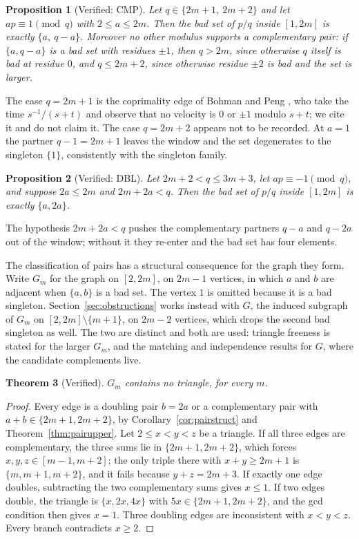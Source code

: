 \documentclass[11pt]{amsart}
\theoremstyle{plain}
\newtheorem{theorem}{Theorem}[section]
\newtheorem{proposition}[theorem]{Proposition}
\theoremstyle{definition}
\begin{document}
\begin{proposition}[Verified: CMP]\label{prop:cmp}
Let $q \in \{2m+1,\ 2m+2\}$ and let $a p \equiv 1 \pmod q$ with $2 \le a \le 2m$. Then the bad set
of $p/q$ inside $[1,2m]$ is exactly $\{a,\ q-a\}$. Moreover no other modulus supports a
complementary pair: if $\{a, q-a\}$ is a bad set with residues $\pm 1$, then $q > 2m$, since
otherwise $q$ itself is bad at residue $0$, and $q \le 2m+2$, since otherwise residue $\pm 2$ is bad
and the set is larger.
\end{proposition}

The case $q = 2m+1$ is the coprimality edge of Bohman and Peng \cite[\S3]{BP}, who take the time
$s^{-1}/(s+t)$ and observe that no velocity is $0$ or $\pm 1$ modulo $s+t$; we cite it and do not
claim it. The case $q = 2m+2$ appears not to be recorded. At $a = 1$ the partner $q-1 = 2m+1$ leaves
the window and the set degenerates to the singleton $\{1\}$, consistently with the singleton family.

\begin{proposition}[Verified: DBL]\label{prop:dbl}
Let $2m+2 < q \le 3m+3$, let $ap \equiv -1 \pmod q$, and suppose $2a \le 2m$ and $2m + 2a < q$. Then
the bad set of $p/q$ inside $[1,2m]$ is exactly $\{a, 2a\}$.
\end{proposition}

The hypothesis $2m + 2a < q$ pushes the complementary partners $q-a$ and $q-2a$ out of the window;
without it they re-enter and the bad set has four elements.

The classification of pairs has a structural consequence for the graph they form. Write $G_m$ for
the graph on $[2,2m]$, on $2m-1$ vertices, in which $a$ and $b$ are adjacent when $\{a,b\}$ is a bad
set. The vertex $1$ is omitted because it is a bad singleton. Section~\ref{sec:obstructions} works
instead with $G$, the induced subgraph of $G_m$ on $[2,2m]\setminus\{m+1\}$, on $2m-2$ vertices,
which drops the second bad singleton as well. The two are distinct and both are used: triangle
freeness is stated for the larger $G_m$, and the matching and independence results for $G$, where
the candidate complements live.

\begin{theorem}[Verified]\label{thm:trianglefree}
$G_m$ contains no triangle, for every $m$.
\end{theorem}

\begin{proof}
Every edge is a doubling pair $b = 2a$ or a complementary pair with $a + b \in \{2m+1, 2m+2\}$, by
Corollary~\ref{cor:pairstruct} and Theorem~\ref{thm:pairupper}. Let $2 \le x < y < z$ be a
triangle. If all three edges are complementary, the three sums lie in $\{2m+1,2m+2\}$, which forces
$x,y,z \in [m-1,m+2]$; the only triple there with $x+y \ge 2m+1$ is $\{m,m+1,m+2\}$, and it fails
because $y+z = 2m+3$. If exactly one edge doubles, subtracting the two complementary sums gives
$x \le 1$. If two edges double, the triangle is $\{x,2x,4x\}$ with $5x \in \{2m+1,2m+2\}$, and the
gcd condition then gives $x = 1$. Three doubling edges are inconsistent with $x<y<z$. Every branch
contradicts $x \ge 2$.
\end{proof}
\end{document}

